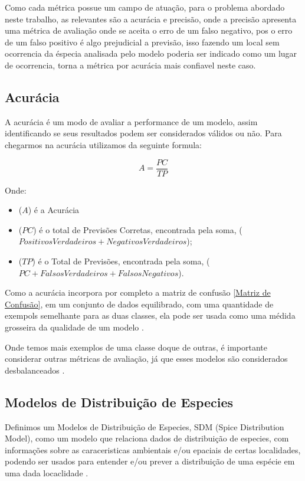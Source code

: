 \documentclass[
	12pt,				%
	openright,			%
	oneside,			%
	a4paper,			%
	english,			%
	brazil				%
	]{abntex2}
\begin{document}
Como cada métrica possue um campo de atuação, para o problema abordado neste trabalho, as relevantes são a acurácia e precisão,
onde a precisão apresenta uma métrica de avaliação onde se aceita o erro de um falso negativo, pos o erro de um falso positivo
é algo prejudicial a previsão, isso fazendo um local sem ocorrencia da éspecia analisada pelo modelo poderia ser indicado como 
um lugar de ocorrencia, torna a métrica por acurácia mais confiavel neste caso.

\subsection{Acurácia}

A acurácia é um modo de avaliar a performance de um modelo, assim identificando se seus resultados podem
ser considerados válidos ou não. Para chegarmos na acurácia utilizamos da seguinte formula:

\begin{equation}
	\label{conta_acuracia}
	A = \frac{PC}{TP}
\end{equation}

Onde:
\begin{itemize}
	\item ($A$) é a Acurácia
	\item ($PC$) é o total de Previsões Corretas, encontrada pela soma, ($Positivos Verdadeiros + Negativos Verdadeiros$);
	\item ($TP$) é o Total de Previsões, encontrada pela soma, ($PC + Falsos Verdadeiros + Falsos Negativos$).
\end{itemize}

Como a acurácia incorpora por completo a matriz de confusão \ref{Matriz de Confusão}, em um conjunto de dados equilibrado, 
com uma quantidade de exempols semelhante para as duas classes, ela pode ser usada como uma médida grosseira da qualidade 
de um modelo \cite{acuracia_matriz}.

Onde temos mais exemplos de uma classe doque de outras, é importante considerar outras métricas de avaliação, já que esses
modelos são considerados desbalanceados \cite{acuracia}.

\subsection{Modelos de Distribuição de Especies}

Definimos um Modelos de Distribuição de Especies, SDM (Spice Distribution Model), como um modelo que relaciona dados de 
distribuição de especies, com informações sobre as caraceristicas ambientais e/ou epaciais de certas localidades, podendo 
ser usados para entender e/ou prever a distribuição de uma espécie em uma dada locaclidade \cite{speciesDistributionModels}.
\end{document}
